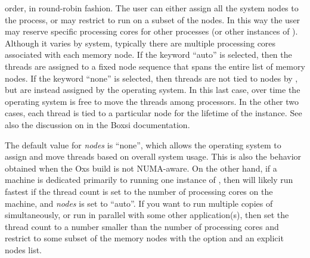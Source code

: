 \begin{description}
  order, in round-robin fashion.  The user can either assign all the
  system nodes to the  process, or may restrict 
  to run on a subset of the nodes.  In this way the user may reserve
  specific processing cores for other processes (or other instances of
  ).  Although it varies by system, typically there are
  multiple processing cores associated with each memory node.  If the
  keyword ``auto'' is selected, then the threads are assigned to a
  fixed node sequence that spans the entire list of memory nodes.  If
  the keyword ``none'' is selected, then threads are not tied to nodes
  by , but are instead assigned by the operating system.
  In this last case, over time the operating system is free to move
  the threads among processors.  In the other two cases, each thread
  is tied to a particular node for the lifetime of the 
   instance.  See also the discussion on  in the Boxsi documentation.

  The default value for \textit{nodes} is ``none'', which allows the
  operating system to assign and move threads based on overall system
  usage.  This is also the behavior obtained when the Oxs build is not
  NUMA-aware.  On the other hand, if a machine is dedicated primarily
  to running one instance of , then  will
  likely run fastest if the thread count is set to the number of
  processing cores on the machine, and \textit{nodes} is set to
  ``auto''.  If you want to run multiple copies of 
  simultaneously, or run  in parallel with some other
  application(s), then set the thread count to a number smaller than
  the number of processing cores and restrict  to some
  subset of the memory nodes with the  option and an
  explicit nodes list.


\end{description}
